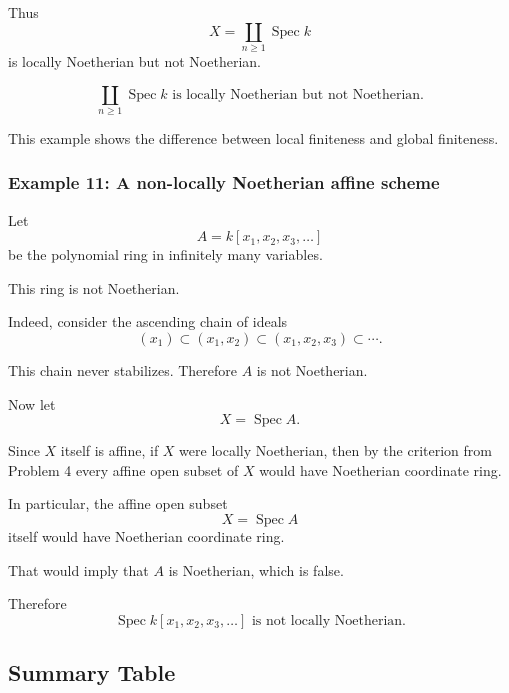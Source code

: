 \documentclass[12pt,a4paper]{article}
\DeclareMathOperator{\Spec}{Spec}
\providecommand{\Spec}{\operatorname{Spec}}
\theoremstyle{notespace}
\begin{document}
Thus
\[
X=\coprod_{n\geq 1}\Spec k
\]
is locally Noetherian but not Noetherian.

\[
\boxed{
	\coprod_{n\geq 1}\Spec k
	\text{ is locally Noetherian but not Noetherian.}
}
\]

This example shows the difference between local finiteness and global finiteness.

\subsubsection*{Example 11: A non-locally Noetherian affine scheme}

Let
\[
A=k[x_1,x_2,x_3,\dots]
\]
be the polynomial ring in infinitely many variables.

This ring is not Noetherian.

Indeed, consider the ascending chain of ideals
\[
(x_1)
\subset
(x_1,x_2)
\subset
(x_1,x_2,x_3)
\subset
\cdots.
\]

This chain never stabilizes. Therefore \(A\) is not Noetherian.

Now let
\[
X=\Spec A.
\]

Since \(X\) itself is affine, if \(X\) were locally Noetherian, then by the criterion from Problem 4 every affine open subset of \(X\) would have Noetherian coordinate ring.

In particular, the affine open subset
\[
X=\Spec A
\]
itself would have Noetherian coordinate ring.

That would imply that \(A\) is Noetherian, which is false.

Therefore
\[
\boxed{
	\Spec k[x_1,x_2,x_3,\dots]
	\text{ is not locally Noetherian.}
}
\]

\subsection{Summary Table}
\end{document}
